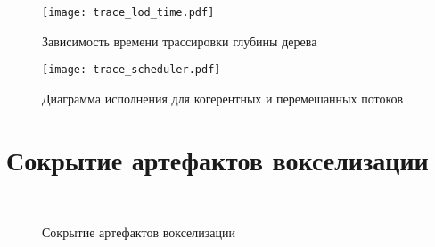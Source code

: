 \begin{figure}[h]
\center
\texttt{[image: trace\_lod\_time.pdf]}
\caption{Зависимость времени трассировки глубины дерева}
\label{fig:trace_lod_time}
\end{figure}


\begin{figure}[h]
\center
\texttt{[image: trace\_scheduler.pdf]}
\caption{Диаграмма исполнения для когерентных и перемешанных потоков}
\label{fig:trace_scheduler}
\end{figure}


\section{Сокрытие артефактов вокселизации}

\begin{figure}[h]
  \begin{center}
     \\
  \end{center}
  \caption{Сокрытие артефактов вокселизации}
  \label{fig:edge}
\end{figure}
